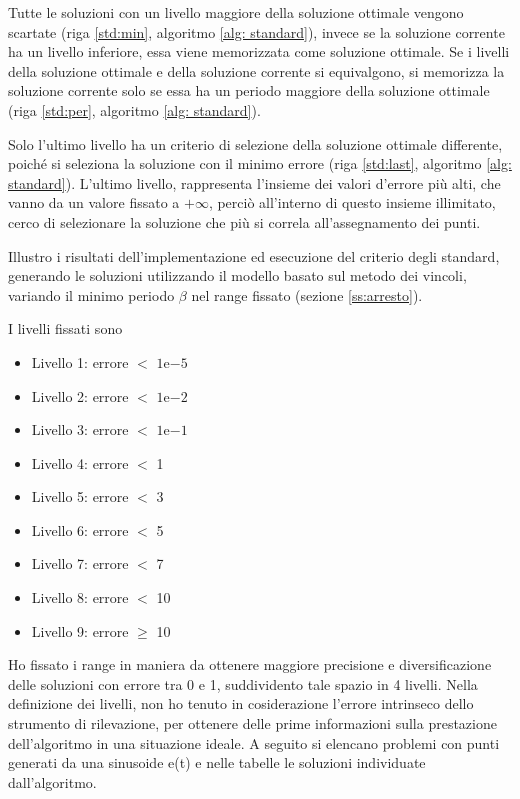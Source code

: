 \documentclass[a4paper,12pt]{report}
\newcommand{\expnumber}[2]{{#1}\mathrm{e}{#2}}
\begin{document}
Tutte le soluzioni con un livello maggiore della soluzione ottimale vengono scartate (riga \ref{std:min}, algoritmo \ref{alg: standard}), invece se la soluzione corrente ha un livello inferiore, essa viene memorizzata come soluzione ottimale. Se i livelli della soluzione ottimale e della soluzione corrente si equivalgono, si memorizza la soluzione corrente solo se essa ha un periodo maggiore della soluzione ottimale (riga \ref{std:per}, algoritmo \ref{alg: standard}).

Solo l'ultimo livello ha un criterio di selezione della soluzione ottimale differente, poiché si seleziona la soluzione con il minimo errore (riga \ref{std:last}, algoritmo \ref{alg: standard}). L'ultimo livello,  rappresenta l'insieme dei valori d'errore più alti, che vanno da un valore fissato a $+\infty$, perciò all'interno di questo insieme illimitato, cerco di selezionare la soluzione che più si correla all'assegnamento dei punti.

Illustro i risultati dell'implementazione ed esecuzione del criterio degli standard, generando le soluzioni utilizzando il modello basato sul metodo dei vincoli, variando il minimo periodo $\beta$ nel range fissato (sezione \ref{ss:arresto}).

I livelli fissati sono
\begin{itemize}
  \item Livello 1: errore $<$ $\expnumber{1}{-5}$
  \item Livello 2: errore $<$ $\expnumber{1}{-2}$
  \item Livello 3: errore $<$ $\expnumber{1}{-1}$
  \item Livello 4: errore $<$ 1
  \item Livello 5: errore $<$ 3
  \item Livello 6: errore $<$ 5
  \item Livello 7: errore $<$ 7
  \item Livello 8: errore $<$ 10
  \item Livello 9: errore $\geq$ 10
\end{itemize}
Ho fissato i range in maniera da ottenere maggiore precisione e diversificazione delle soluzioni con errore tra 0 e 1, suddividento tale spazio in 4 livelli. Nella definizione dei livelli, non ho tenuto in cosiderazione l'errore intrinseco dello strumento di rilevazione, per ottenere delle prime informazioni sulla prestazione dell'algoritmo in una situazione ideale. A seguito si elencano problemi con punti generati da una sinusoide e(t) e nelle tabelle le soluzioni individuate dall'algoritmo.
\end{document}
